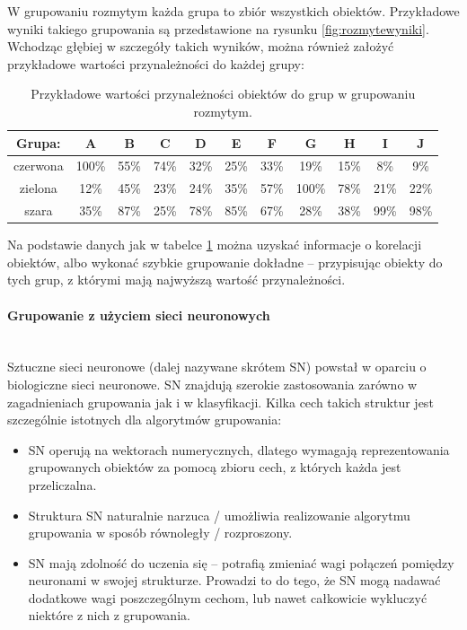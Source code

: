 \documentclass{article}
\newcommand{\myparagraph}[1]{\paragraph{#1}\mbox{}\\}
\begin{document}
W grupowaniu rozmytym każda grupa to zbiór wszystkich obiektów. Przykładowe wyniki takiego grupowania są przedstawione na rysunku \ref{fig:rozmytewyniki}. Wchodząc głębiej w szczegóły takich wyników, można również założyć przykładowe wartości przynależności do każdej grupy:

\begin{table}
	\centering
	\begin{tabular}{c|c|c|c|c|c|c|c|c|c|c}
		Grupa: & A & B & C & D & E & F & G & H & I & J \\ \hline
		czerwona & 100\% & 55\% & 74\% & 32\% & 25\% & 33\% & 19\% & 15\% & 8\% & 9\% \\ \hline
		zielona & 12\% & 45\% & 23\% & 24\% & 35\% & 57\% & 100\% & 78\% & 21\% & 22\% \\ \hline
		szara & 35\% & 87\% & 25\% & 78\% & 85\% & 67\% & 28\% & 38\% & 99\% & 98\%
	\end{tabular}
	\caption{Przykładowe wartości przynależności obiektów do grup w grupowaniu rozmytym.}
	\label{tab:rozmytewyniki}
\end{table}

Na podstawie danych jak w tabelce \ref{tab:rozmytewyniki} można uzyskać informacje o korelacji obiektów, albo wykonać szybkie grupowanie dokładne – przypisując obiekty do tych grup, z którymi mają najwyższą wartość przynależności.

\myparagraph{Grupowanie z użyciem sieci neuronowych}

Sztuczne sieci neuronowe (dalej nazywane skrótem SN) powstał w oparciu o biologiczne sieci neuronowe. SN znajdują szerokie zastosowania zarówno w zagadnieniach grupowania jak i w klasyfikacji. Kilka cech takich struktur jest szczególnie istotnych dla algorytmów grupowania:

\begin{itemize}
	\item SN operują na wektorach numerycznych, dlatego wymagają reprezentowania grupowanych obiektów za pomocą zbioru cech, z których każda jest przeliczalna.
	\item Struktura SN naturalnie narzuca / umożliwia realizowanie algorytmu grupowania w sposób równoległy / rozproszony.
	\item SN mają zdolność do uczenia się – potrafią zmieniać wagi połączeń pomiędzy neuronami w swojej strukturze. Prowadzi to do tego, że SN mogą nadawać dodatkowe wagi poszczególnym cechom, lub nawet całkowicie wykluczyć niektóre z nich z grupowania.
\end{itemize}
\end{document}
